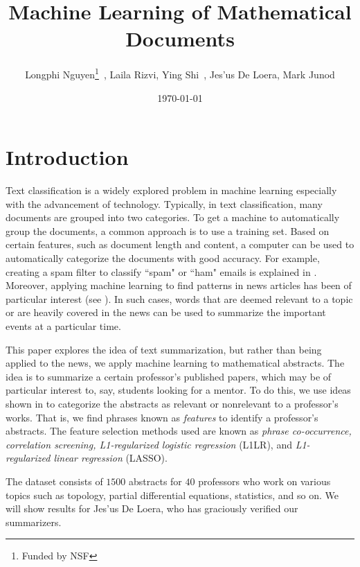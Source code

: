 \documentclass{article}
\title{Machine Learning of Mathematical Documents}
\author{Longphi Nguyen\footnote{Funded by NSF}\saveFN\sft\ , Laila Rizvi, Ying Shi\useFN\sft\ , Jes\a'us De Loera, Mark Junod }
\date{\today}
\begin{document}
\maketitle
\begin{titlepage}
\end{titlepage}
\tableofcontents
\setcounter{tocdepth}{5}
\newpage
\section{Introduction} \label{sec:intro}
\indent
Text classification is a widely explored problem in machine learning especially with the advancement of technology. Typically, in text classification, many documents are grouped into two categories. To get a machine to automatically group the documents, a common approach is to use a training set. Based on certain features, such as document length and content, a computer can be used to automatically categorize the documents with good accuracy. For example, creating a spam filter to classify ``spam" or ``ham" emails is explained in \cite{AIbook}. Moreover, applying machine learning to find patterns in news articles has been of particular interest (see \cite{nello}). In such cases, words that are deemed relevant to a topic or are heavily covered in the news can be used to summarize the important events at a particular time. 

This paper explores the idea of text summarization, but rather than being applied to the news, we apply machine learning to mathematical abstracts. The idea is to summarize a certain professor's published papers, which may be of particular interest to, say, students looking for a mentor. To do this, we use ideas shown in \cite{elghaoui_1} to categorize the abstracts as relevant or nonrelevant to a professor's works. That is, we find phrases known as \emph{features} to identify a professor's abstracts. The feature selection methods used are known as \emph{phrase co-occurrence, correlation screening, L1-regularized logistic regression} (L1LR), and \emph{L1-regularized linear regression} (LASSO).

The dataset consists of $1500$ abstracts for $40$ professors who work on various topics such as topology, partial differential equations, statistics, and so on. We will show results for Jes\a'us De Loera, who has graciously verified our summarizers.
\end{document}

